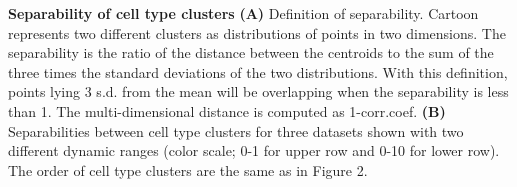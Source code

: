 \textbf{Separability of cell type clusters}
\textbf{(A)} Definition of separability. Cartoon represents two different clusters as distributions of points in two dimensions. The separability is the ratio of the distance between the centroids to the sum of the three times the standard deviations of the two distributions. With this definition, points lying 3 s.d. from the mean will be overlapping when the separability is less than 1. The multi-dimensional distance is computed as 1-corr.coef.
\textbf{(B)} Separabilities between cell type clusters for three datasets shown with two different dynamic ranges (color scale; 0-1 for upper row and 0-10 for lower row).  The order of cell type clusters are the same as in Figure 2.